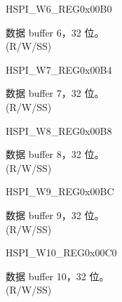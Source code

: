 \begin{register}{H}{SPI\_W6\_REG}{0x00B0}\label{regdesc:SPIW6REG}
%
\regnewline%
\begin{regdesc}\begin{reglist}
\label{fielddesc:SPIBUF6}\item [SPI\_BUF6] 数据 buffer 6，32 位。\\
(R/W/SS)
\end{reglist}\end{regdesc}
\end{register}


\begin{register}{H}{SPI\_W7\_REG}{0x00B4}\label{regdesc:SPIW7REG}
%
\regnewline%
\begin{regdesc}\begin{reglist}
\label{fielddesc:SPIBUF7}\item [SPI\_BUF7] 数据 buffer 7，32 位。\\
(R/W/SS)
\end{reglist}\end{regdesc}
\end{register}


\begin{register}{H}{SPI\_W8\_REG}{0x00B8}\label{regdesc:SPIW8REG}
%
\regnewline%
\begin{regdesc}\begin{reglist}
\label{fielddesc:SPIBUF8}\item [SPI\_BUF8] 数据 buffer 8，32 位。\\
(R/W/SS)
\end{reglist}\end{regdesc}
\end{register}


\begin{register}{H}{SPI\_W9\_REG}{0x00BC}\label{regdesc:SPIW9REG}
%
\regnewline%
\begin{regdesc}\begin{reglist}
\label{fielddesc:SPIBUF9}\item [SPI\_BUF9] 数据 buffer 9，32 位。\\
(R/W/SS)
\end{reglist}\end{regdesc}
\end{register}


\begin{register}{H}{SPI\_W10\_REG}{0x00C0}\label{regdesc:SPIW10REG}
%
\regnewline%
\begin{regdesc}\begin{reglist}
\label{fielddesc:SPIBUF10}\item [SPI\_BUF10] 数据 buffer 10，32 位。\\
(R/W/SS)
\end{reglist}\end{regdesc}
\end{register}


